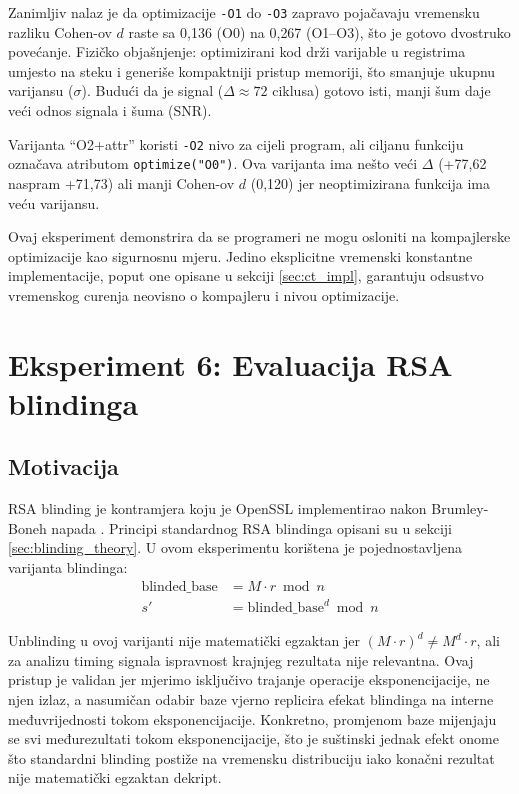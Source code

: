Zanimljiv nalaz je da optimizacije \texttt{-O1} do \texttt{-O3} zapravo pojačavaju vremensku razliku Cohen-ov $d$ raste sa 0{,}136 (O0) na 0{,}267 (O1--O3), što je gotovo dvostruko povećanje. Fizičko objašnjenje: optimizirani kod drži varijable u registrima umjesto na steku i generiše kompaktniji pristup memoriji, što smanjuje ukupnu varijansu ($\sigma$). Budući da je signal ($\Delta \approx 72$ ciklusa) gotovo isti, manji šum daje veći odnos signala i šuma (SNR).

Varijanta ``O2+attr'' koristi \texttt{-O2} nivo za cijeli program, ali ciljanu funkciju označava atributom \texttt{optimize("O0")}. Ova varijanta ima nešto veći $\Delta$ (+77{,}62 naspram +71{,}73) ali manji Cohen-ov $d$ (0{,}120) jer neoptimizirana funkcija ima veću varijansu.

Ovaj eksperiment demonstrira da se programeri ne mogu osloniti na kompajlerske optimizacije kao sigurnosnu mjeru. Jedino eksplicitne vremenski konstantne implementacije, poput one opisane u sekciji \ref{sec:ct_impl}, garantuju odsustvo vremenskog curenja neovisno o kompajleru i nivou optimizacije.


\section{Eksperiment 6: Evaluacija RSA blindinga}

\subsection{Motivacija}

RSA blinding je kontramjera koju je OpenSSL implementirao nakon Brumley-Boneh napada \cite{brumley2003}. Principi standardnog RSA blindinga opisani su u sekciji \ref{sec:blinding_theory}. U ovom eksperimentu korištena je pojednostavljena varijanta blindinga:
\begin{align}
\text{blinded\_base} &= M \cdot r \bmod n \\
s' &= \text{blinded\_base}^d \bmod n
\end{align}

Unblinding u ovoj varijanti nije matematički egzaktan jer $(M \cdot r)^d \neq M^d \cdot r$, ali za analizu timing signala ispravnost krajnjeg rezultata nije relevantna. Ovaj pristup je validan jer mjerimo isključivo trajanje operacije eksponencijacije, ne njen izlaz, a nasumičan odabir baze vjerno replicira efekat blindinga na interne međuvrijednosti tokom eksponencijacije. Konkretno, promjenom baze mijenjaju se svi međurezultati tokom eksponencijacije, što je suštinski jednak efekt onome što standardni blinding postiže na vremensku distribuciju iako konačni rezultat nije matematički egzaktan dekript.

